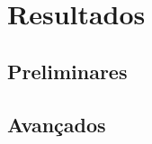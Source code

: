 \chapter{Resultados}
\label{chapter:cap9}
\section{\textbf{Preliminares}}
\section{\textbf{Avançados}}